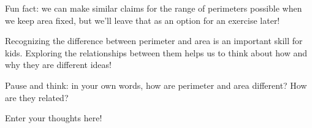 \documentclass{ximera}
\begin{document}
Fun fact: we can make similar claims for the range of perimeters possible when we keep area fixed, but we'll leave that as an option for an exercise later!

Recognizing the difference between perimeter and area is an important skill for kids. Exploring the relationships between them helps us to think about how and why they are different ideas!
\begin{question}
Pause and think: in your own words, how are perimeter and area different? How are they related?
\begin{freeResponse}
Enter your thoughts here!
\end{freeResponse}
\end{question}
\end{document}
